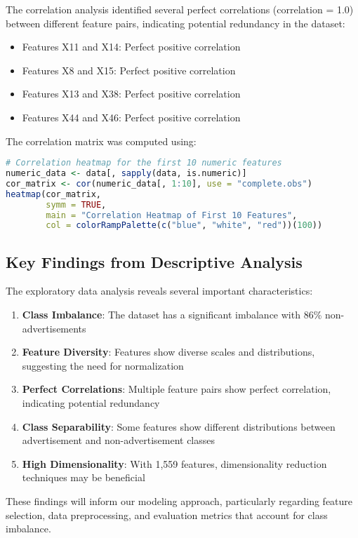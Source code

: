 The correlation analysis identified several perfect correlations (correlation = 1.0) between different feature pairs, indicating potential redundancy in the dataset:
\begin{itemize}
    \item Features X11 and X14: Perfect positive correlation
    \item Features X8 and X15: Perfect positive correlation
    \item Features X13 and X38: Perfect positive correlation
    \item Features X44 and X46: Perfect positive correlation
\end{itemize}

The correlation matrix was computed using:

\begin{lstlisting}[language=R]
# Correlation heatmap for the first 10 numeric features
numeric_data <- data[, sapply(data, is.numeric)]
cor_matrix <- cor(numeric_data[, 1:10], use = "complete.obs")
heatmap(cor_matrix, 
        symm = TRUE, 
        main = "Correlation Heatmap of First 10 Features",
        col = colorRampPalette(c("blue", "white", "red"))(100))
\end{lstlisting}

\subsection{Key Findings from Descriptive Analysis}
The exploratory data analysis reveals several important characteristics:

\begin{enumerate}
    \item \textbf{Class Imbalance}: The dataset has a significant imbalance with 86\% non-advertisements
    \item \textbf{Feature Diversity}: Features show diverse scales and distributions, suggesting the need for normalization
    \item \textbf{Perfect Correlations}: Multiple feature pairs show perfect correlation, indicating potential redundancy
    \item \textbf{Class Separability}: Some features show different distributions between advertisement and non-advertisement classes
    \item \textbf{High Dimensionality}: With 1,559 features, dimensionality reduction techniques may be beneficial
\end{enumerate}

These findings will inform our modeling approach, particularly regarding feature selection, data preprocessing, and evaluation metrics that account for class imbalance.